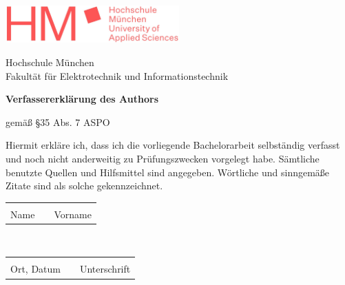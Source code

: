 \newpage
\begin{center}
    \includegraphics[width=0.5\textwidth]{figures/logos/A_HM_Logo_incl_text.jpg}\\[1cm]
    {\Large Hochschule München \\ Fakultät für Elektrotechnik und Informationstechnik \par}
    \vspace{1cm}
    {\Large\textbf{Verfassererklärung des Authors} \par}
    \vspace{0.5cm}
    {\small gemäß §35 Abs. 7 ASPO\par}
\end{center}
\vspace{1cm}
\newblock{}
Hiermit erkläre ich, dass ich die vorliegende Bachelorarbeit selbständig verfasst und noch
nicht anderweitig zu Prüfungszwecken vorgelegt habe.
Sämtliche benutzte Quellen und Hilfsmittel sind angegeben. Wörtliche und sinngemäße
Zitate sind als solche gekennzeichnet.

\vspace{1cm}

\begin{tabular}{lp{2em}l}
    \hspace{6cm}   && \hspace{6cm} \\\cline{1-1}\cline{3-3}
    Name     && Vorname
\end{tabular} \\
\begin{tabular}{lp{2em}l}
 \hspace{6cm}   && \hspace{6cm} \\\cline{1-1}\cline{3-3}
 Ort, Datum     && Unterschrift
\end{tabular}


\vspace{3cm}
\newpage
